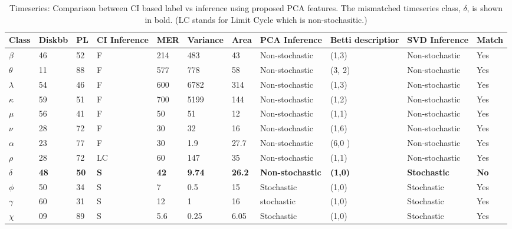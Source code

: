 \documentclass[10pt,conference]{IEEEtran}
\begin{document}
\begin{table}[t]
\caption{Timeseries: Comparison between CI based label vs inference using proposed PCA features. The mismatched timeseries class, $\delta$, is shown in bold. (LC stands for Limit Cycle \cite{Adegoke2018} which is non-stochasitic.)}
\begin{center}
  \begin{tabular}{|p{0.5cm}|p{0.75cm}|p{0.75cm}|p{1cm}|p{0.75cm}|p{1cm}|p{0.5cm}|p{1.8cm}|p{2.5cm}|p{3cm}|p{0.75cm}|}
\hline
Class & Diskbb & PL  & CI \newline Inference & MER & Variance & Area & PCA \newline Inference & Betti descriptior & SVD  \newline Inference & Match \\
\hline
$\beta$ & 46 & 52 & F &214 & 483 & 43 & Non-stochastic & (1,3)& Non-stochastic &Yes\\
\hline
$\theta$  & 11 &  88 & F & 577 & 778 & 58&Non-stochastic & (3, 2) & Non-stochastic & Yes \\
\hline
$\lambda$ &  54 & 46 & F & 600 & 6782 & 314 & Non-stochastic & (1,3) &Non-stochastic&Yes \\
\hline
$\kappa$ &  59 & 51 & F & 700 & 5199 & 144 & Non-stochastic & (1,2) &Non-stochastic&Yes \\
\hline
$\mu$  & 56 & 41& F & 50 & 51 & 12 & Non-stochastic & (1,1) &Non-stochastic&Yes \\
\hline
$\nu$  & 28 & 72 & F & 30 & 32 & 16 & Non-stochastic & (1,6) &Non-stochastic&Yes\\
\hline
$\alpha$  & 23 & 77& F & 30 & 1.9 & 27.7 & Non-stochastic & (6,0 ) &Non-stochastic&Yes \\
\hline
$\rho$  & 28 & 72 & LC & 60 & 147 & 35 & Non-stochastic & (1,1) &Non-stochastic&Yes \\
\hline
\textbf{$\delta$}  & \textbf{48} & \textbf{50} &  \textbf{S} & \textbf{42} & \textbf{9.74} & \textbf{26.2} & \textbf{Non-stochastic} &\textbf{(1,0)}& \textbf{Stochastic}& \textbf{No} \\
\hline
$\phi$  & 50 & 34 & S & 7 & 0.5 & 15 & Stochastic &(1,0)&Stochastic& Yes \\
\hline
$\gamma$  & 60 & 31 & S & 12 & 1 & 16 & stochastic &(1,0)&Stochastic& Yes \\
\hline
$\chi$  & 09 & 89 & S & 5.6 & 0.25 & 6.05 & Stochastic &(1,0)&Stochastic& Yes \\
\hline
\end{tabular}
\label{tab:results}
\end{center}
\end{table}
\end{document}
